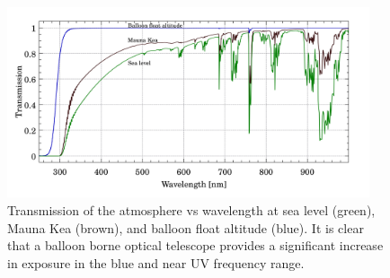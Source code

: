 \begin{figure}
    \begin{small}
        \begin{center}
            \includegraphics[width=0.95\textwidth]{Introduction/figs/atmosphere.jpg}
        \end{center}
        \caption{Transmission of the atmosphere vs wavelength at sea level (green), Mauna Kea (brown), and balloon float altitude (blue). It is clear that a balloon borne optical telescope provides a significant increase in exposure in the blue and near UV frequency range.}
        \label{fig:atmos}
    \end{small}
\end{figure}


